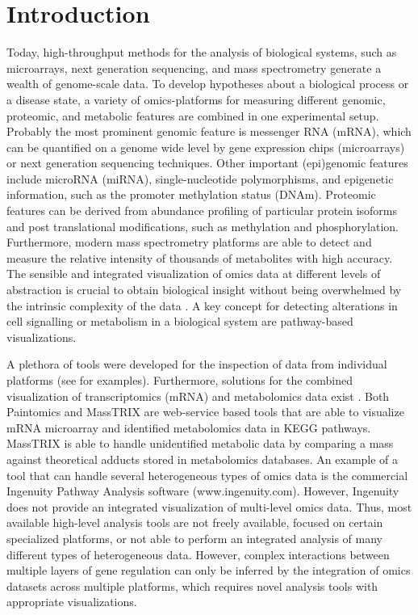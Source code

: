 \documentclass[final,5p,times,twocolumn]{elsarticle}
\begin{document}

\section{Introduction}
Today, high-throughput methods for the analysis of biological systems, such as microarrays, next generation sequencing, and mass spectrometry generate a wealth of genome-scale data. To develop hypotheses about a biological process or a disease state, a variety of omics-platforms for measuring different genomic, proteomic, and metabolic features are combined in one experimental setup. Probably the most prominent genomic feature is messenger RNA (mRNA), which can be quantified on a genome wide level by gene expression chips (microarrays) or next generation sequencing techniques. Other important (epi)genomic features include microRNA (miRNA), single-nucleotide polymorphisms, and epigenetic information, such as the promoter methylation status (DNAm). Proteomic features can be derived from abundance profiling of particular protein isoforms and post translational modifications, such as methylation and phosphorylation. Furthermore, modern mass spectrometry platforms are able to detect and measure the relative intensity of thousands of metabolites with high accuracy. The sensible and integrated visualization of omics data at different levels of abstraction is crucial to obtain biological insight without being overwhelmed by the intrinsic complexity of the data \cite{Gehlenborg2010}. A key concept for detecting alterations in cell signalling or metabolism in a biological system are pathway-based visualizations.

A plethora of tools were developed for the inspection of data from individual platforms (see \cite{Gehlenborg2010} for examples). Furthermore, solutions for the combined visualization of transcriptomics (mRNA) and metabolomics data exist \cite{Garcia-Alcalde2011,Waegele2012}. Both Paintomics \cite{Garcia-Alcalde2011} and MassTRIX \cite{Waegele2012} are web-service based tools that are able to visualize mRNA microarray and identified metabolomics data in KEGG \cite{Kanehisa2006} pathways. MassTRIX is able to handle unidentified metabolic data by comparing a mass against theoretical adducts stored in metabolomics databases. An example of a tool that can handle several heterogeneous types of omics data is the commercial Ingenuity Pathway Analysis software (www.ingenuity.com). However, Ingenuity does not provide an integrated visualization of multi-level omics data. Thus, most available high-level analysis tools are not freely available, focused on certain specialized platforms, or not able to perform an integrated analysis of many different types of heterogeneous data. However, complex interactions between multiple layers of gene regulation can only be inferred by the integration of omics datasets across multiple platforms, which requires novel analysis tools with appropriate visualizations.
\end{document}
